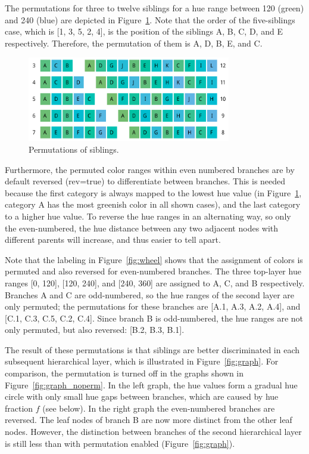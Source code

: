 \documentclass[journal]{vgtc}                %
\begin{document}
The permutations for three to twelve siblings for a hue range between 120 (green) and 240 (blue) are depicted in Figure~\ref{fig:perm}. Note that the order of the five-siblings case, which is [1, 3, 5, 2, 4], is the position of the siblings A, B, C, D, and E respectively. Therefore, the permutation of them is A, D, B, E, and C. 

\begin{figure}[tb]
  \centering
  \includegraphics[width=3.5in]{Permutations.pdf}
  \caption{Permutations of siblings.}\label{fig:perm}
\end{figure}


Furthermore, the permuted color ranges within even numbered branches are by default reversed (\textsf{rev=true}) to differentiate between branches. This is needed because the first category is always mapped to the lowest hue value (in Figure~\ref{fig:perm}, category A has the most greenish color in all shown cases), and the last category to a higher hue value. To reverse the hue ranges in an alternating way, so only the even-numbered, the hue distance between any two adjacent nodes with different parents will increase, and thus easier to tell apart. 

Note that the labeling in Figure~\ref{fig:wheel} shows that the assignment of colors is permuted and also reversed for even-numbered branches. The three top-layer hue ranges [0, 120], [120, 240], and [240, 360] are assigned to A, C, and B respectively. Branches A and C are odd-numbered, so the hue ranges of the second layer are only permuted; the permutations for these branches are [A.1, A.3, A.2, A.4], and [C.1, C.3, C.5, C.2, C.4]. Since branch B is odd-numbered, the hue ranges are not only permuted, but also reversed: [B.2, B.3, B.1].

The result of these permutations is that siblings are better discriminated in each subsequent 
hierarchical layer, which is illustrated in Figure~\ref{fig:graph}. For comparison, the permutation 
is turned off in the graphs shown in Figure~\ref{fig:graph_noperm}. In the left graph, the hue values 
form a gradual hue circle with only small hue gaps between branches, which are caused by hue fraction $f$ (see below). In the right graph the even-numbered branches are reversed. The leaf nodes of branch B are now more distinct from the other leaf nodes. However, the distinction between branches of the second hierarchical layer is still less than with permutation enabled (Figure~\ref{fig:graph}).
\end{document}
